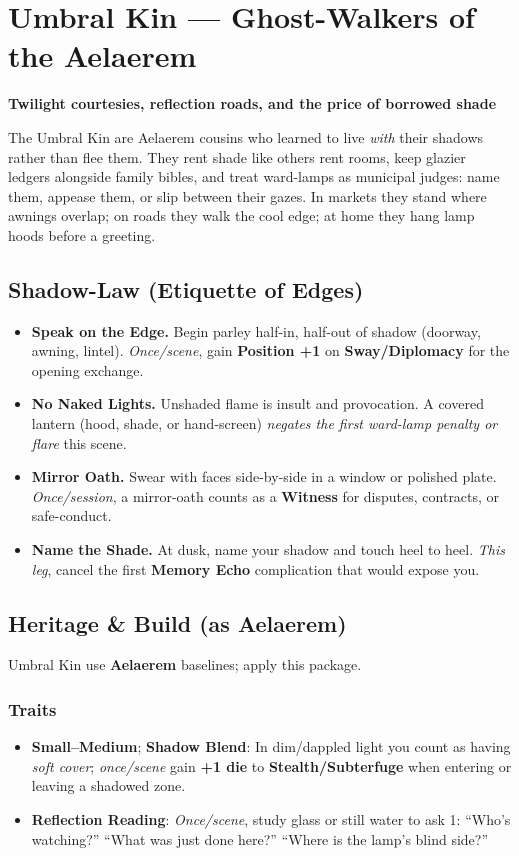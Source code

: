 \documentclass[11pt]{book}
\begin{document}
\section{Umbral Kin --- Ghost-Walkers of the Aelaerem}
\textbf{Twilight courtesies, reflection roads, and the price of borrowed shade}

The Umbral Kin are Aelaerem cousins who learned to live \emph{with} their shadows rather than flee them. They rent shade like others rent rooms, keep glazier ledgers alongside family bibles, and treat ward-lamps as municipal judges: name them, appease them, or slip between their gazes. In markets they stand where awnings overlap; on roads they walk the cool edge; at home they hang lamp hoods before a greeting.

\subsection*{Shadow-Law (Etiquette of Edges)}
\begin{itemize}
    \item \textbf{Speak on the Edge.} Begin parley half-in, half-out of shadow (doorway, awning, lintel). \emph{Once/scene}, gain \textbf{Position +1} on \textbf{Sway/Diplomacy} for the opening exchange.
    \item \textbf{No Naked Lights.} Unshaded flame is insult and provocation. A covered lantern (hood, shade, or hand-screen) \emph{negates the first ward-lamp penalty or flare} this scene.
    \item \textbf{Mirror Oath.} Swear with faces side-by-side in a window or polished plate. \emph{Once/session}, a mirror-oath counts as a \textbf{Witness} for disputes, contracts, or safe-conduct.
    \item \textbf{Name the Shade.} At dusk, name your shadow and touch heel to heel. \emph{This leg}, cancel the first \textbf{Memory Echo} complication that would expose you.
\end{itemize}

\subsection*{Heritage \& Build (as Aelaerem)}
Umbral Kin use \textbf{Aelaerem} baselines; apply this package.

\subsubsection*{Traits}
\begin{itemize}
    \item \textbf{Small--Medium}; \textbf{Shadow Blend}: In dim/dappled light you count as having \emph{soft cover}; \emph{once/scene} gain \textbf{+1 die} to \textbf{Stealth/Subterfuge} when entering or leaving a shadowed zone.
    \item \textbf{Reflection Reading}: \emph{Once/scene}, study glass or still water to ask 1: ``Who's watching?'' ``What was just done here?'' ``Where is the lamp's blind side?''
\end{itemize}
\end{document}
